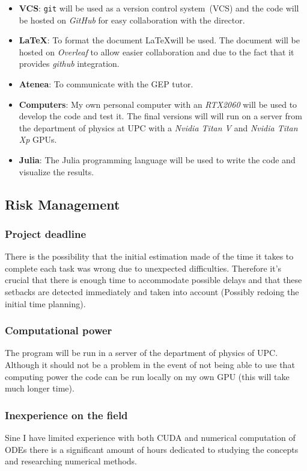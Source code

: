 \begin{itemize}
    \item \textbf{VCS}: \texttt{git} will be used as a version control
        system~(VCS) and the code will be hosted on \emph{GitHub} for easy
        collaboration with the director.
    \item \textbf{\LaTeX}: To format the document \LaTeX will be used. The
        document will be hosted on \emph{Overleaf} to allow easier collaboration
        and due to the fact that it provides \emph{github} integration.
    \item \textbf{Atenea}: To communicate with the GEP tutor.
    \item \textbf{Computers}: My own personal computer with an \emph{RTX2060} will be
        used to develop the code and test it. The final versions will will run
        on a server from the department of physics at UPC with a \emph{Nvidia
        Titan V} and \emph{Nvidia Titan Xp} GPUs.
    \item \textbf{Julia}: The Julia programming language will be used to write
        the code and visualize the results.
\end{itemize}



\subsection{Risk Management}


    \subsubsection{Project deadline}
    There is the possibility that the initial estimation made of the time it takes to
    complete each task was wrong due to unexpected difficulties. Therefore it's
    crucial that there is enough time to accommodate possible delays and that
    these setbacks are detected immediately and taken into account (Possibly
    redoing the initial time planning).

    \subsubsection{Computational power}
    The program will be run in a server of the department of physics of UPC.
    Although it should not be a problem in the event of not being able to use
    that computing power the code can be run locally on my own GPU (this will
    take much longer time).

    \subsubsection{Inexperience on the field}
    Sine I have limited experience with both CUDA and numerical computation of
    ODEs there is a significant amount of hours dedicated to studying the
    concepts and researching numerical methods.
